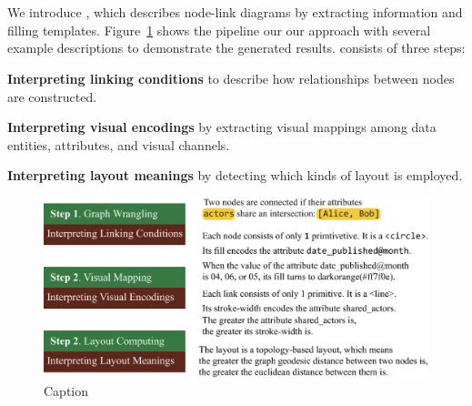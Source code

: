 \section{\ApproachName}
We introduce \ApproachName, which describes node-link diagrams by extracting information and filling templates.
Figure~\ref{fig:workflow} shows the pipeline our our approach with several example descriptions to demonstrate the generated results.
\ApproachName consists of three steps:
\begin{compactenum}
\item \textbf{Interpreting linking conditions} to describe how relationships between nodes are constructed.
\item \textbf{Interpreting visual encodings} by extracting visual mappings among data entities, attributes, and visual channels.
\item \textbf{Interpreting layout meanings} by detecting which kinds of layout is employed.
\end{compactenum}


\begin{figure}
    \centering
    \includegraphics[width=1\columnwidth]{figures/workflow.eps}
    \caption{Caption}
    \label{fig:workflow}
\end{figure}

